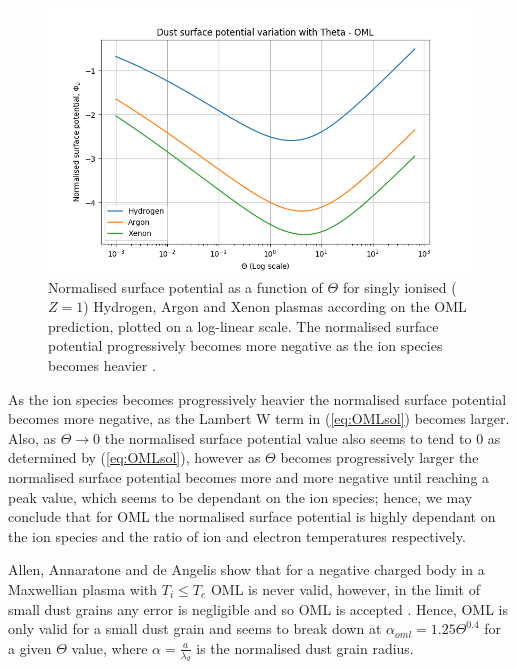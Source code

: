\documentclass[journal]{Imperial_lab_report}
\begin{document}
\begin{figure}[H]
\centering
\includegraphics[width=\linewidth]{Output/OMLgraph.jpeg}
\caption{Normalised surface potential as a function of $\Theta$ for singly ionised ($Z = 1$) Hydrogen, Argon and Xenon plasmas according on the OML prediction, plotted on a log-linear scale. The normalised surface potential progressively becomes more negative as the ion species becomes heavier \cite{Thomas}.}
\label{OMLgraph} 
\end{figure}

As the ion species becomes progressively heavier the normalised surface potential becomes more negative, as the Lambert W term in (\ref{eq:OMLsol}) becomes larger. Also, as  $\Theta \xrightarrow{} 0$ the normalised surface potential value also seems to tend to 0 as determined by (\ref{eq:OMLsol}), however as $\Theta$ becomes progressively larger the normalised surface potential becomes more and more negative until reaching a peak value, which seems to be dependant on the ion species; hence, we may conclude that for OML the normalised surface potential is highly dependant on the ion species and the ratio of ion and electron temperatures respectively.  

\smallskip

Allen, Annaratone and de Angelis \cite{Angelis}  show that for a negative charged body in a Maxwellian plasma with $T_{i} \leq T_{e}$ OML is never valid, however, in the limit of small dust grains any error is negligible and so OML is accepted \cite{Willis}. Hence, OML is only valid for a small dust grain and seems to break down at $\alpha_{oml} = 1.25\Theta^{0.4}$ \cite{Willis} for a given $\Theta$ value, where $\alpha = \frac{a}{\lambda_d}$ is the normalised dust grain radius.
\end{document}
